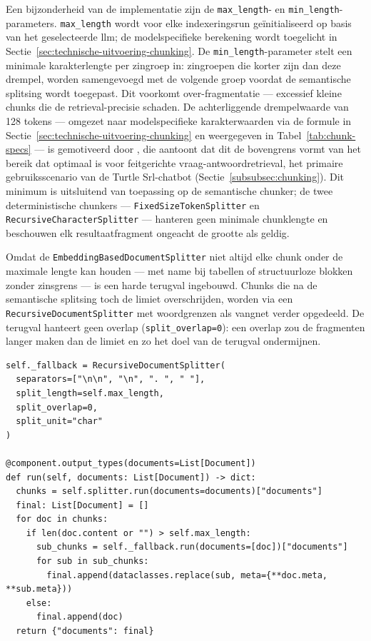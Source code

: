 Een bijzonderheid van de implementatie zijn de \texttt{max\_length}- en \texttt{min\_length}-parameters. \texttt{max\_length} wordt voor elke indexeringsrun geïnitialiseerd op basis van het geselecteerde \gls{llm}; de modelspecifieke berekening wordt toegelicht in Sectie~\ref{sec:technische-uitvoering-chunking}. De \texttt{min\_length}-parameter stelt een minimale karakterlengte per zingroep in: zingroepen die korter zijn dan deze drempel, worden samengevoegd met de volgende groep voordat de semantische splitsing wordt toegepast. Dit voorkomt over-fragmentatie — excessief kleine chunks die de retrieval-precisie schaden. De achterliggende drempelwaarde van 128 tokens — omgezet naar modelspecifieke karakterwaarden via de formule in Sectie~\ref{sec:technische-uitvoering-chunking} en weergegeven in Tabel~\ref{tab:chunk-specs} — is gemotiveerd door \textcite{BhatEtAl2025}, die aantoont dat dit de bovengrens vormt van het bereik dat optimaal is voor feitgerichte vraag-antwoordretrieval, het primaire gebruiksscenario van de Turtle Srl-chatbot (Sectie~\ref{subsubsec:chunking}). Dit minimum is uitsluitend van toepassing op de semantische chunker; de twee deterministische chunkers — \texttt{FixedSizeTokenSplitter} en \texttt{RecursiveCharacterSplitter} — hanteren geen minimale chunklengte en beschouwen elk resultaatfragment ongeacht de grootte als geldig.

Omdat de \texttt{EmbeddingBasedDocumentSplitter} niet altijd elke chunk onder de maximale lengte kan houden — met name bij tabellen of structuurloze blokken zonder zinsgrens — is een harde terugval ingebouwd. Chunks die na de semantische splitsing toch de limiet overschrijden, worden via een \texttt{RecursiveDocumentSplitter} met woordgrenzen als vangnet verder opgedeeld. De terugval hanteert geen overlap (\texttt{split\_overlap=0}): een overlap zou de fragmenten langer maken dan de limiet en zo het doel van de terugval ondermijnen.

\begin{listing}[H]
\begin{verbatim}
self._fallback = RecursiveDocumentSplitter(
  separators=["\n\n", "\n", ". ", " "],
  split_length=self.max_length,
  split_overlap=0,
  split_unit="char"
)

@component.output_types(documents=List[Document])
def run(self, documents: List[Document]) -> dict:
  chunks = self.splitter.run(documents=documents)["documents"]
  final: List[Document] = []
  for doc in chunks:
    if len(doc.content or "") > self.max_length:
      sub_chunks = self._fallback.run(documents=[doc])["documents"]
      for sub in sub_chunks:
        final.append(dataclasses.replace(sub, meta={**doc.meta, **sub.meta}))
    else:
      final.append(doc)
  return {"documents": final}
\end{verbatim}
\caption[SemanticEmbeddingChunker: fallback voor overgrote chunks]{Bij structuurloze blokken — zoals grote tabellen zonder zinsgrens — kan de \texttt{EmbeddingBasedDocumentSplitter} de maximale lengte niet altijd respecteren. De \texttt{RecursiveDocumentSplitter} als harde terugval garandeert dat elke chunk de embedding-modellimiet nooit overschrijdt.}
\label{lst:semantic-chunker-fallback}
\end{listing}

